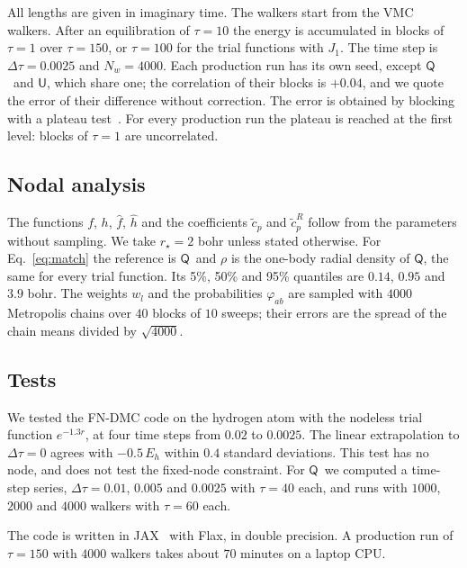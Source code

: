 \documentclass[aps,prb,reprint,amsmath,amssymb,superscriptaddress,nofootinbib]{revtex4-2}
\newcommand{\mQ}{\ensuremath{\textsf{Q}}}
\newcommand{\mU}{\ensuremath{\textsf{U}}}
\newcommand{\Eh}{\,E_h}
\begin{document}
All lengths are given in imaginary time. The walkers start from the VMC
walkers. After an equilibration of $\tau = 10$ the energy is accumulated in
blocks of $\tau = 1$ over $\tau = 150$, or $\tau = 100$ for the trial functions
with $J_1$. The time step is $\Delta\tau = 0.0025$ and $N_w = 4000$. Each
production run has its own seed, except \mQ\ and \mU, which share one; the
correlation of their blocks is $+0.04$, and we quote the error of their
difference without correction. The error is obtained by blocking with a
plateau test~\cite{flyvbjerg1989}. For every production run the plateau is
reached at the first level: blocks of $\tau = 1$ are uncorrelated.

\subsection{Nodal analysis}
\label{ssec:node_method}

The functions $f$, $h$, $\hat f$, $\hat h$ and the coefficients $\tilde c_p$
and $\tilde c_p^{R}$ follow from the parameters without sampling. We take
$r_\star = 2$ bohr unless stated otherwise. For Eq.~\eqref{eq:match} the
reference is \mQ\ and $\rho$ is the one-body radial density of \mQ, the same
for every trial function. Its 5\%, 50\% and 95\% quantiles are $0.14$, $0.95$
and $3.9$ bohr. The weights $w_l$ and the probabilities $\varphi_{ab}$ are
sampled with $4000$ Metropolis chains over $40$ blocks of $10$ sweeps; their
errors are the spread of the chain means divided by $\sqrt{4000}$.

\subsection{Tests}
\label{ssec:tests}

We tested the FN-DMC code on the hydrogen atom with the nodeless trial
function $e^{-1.3 r}$, at four time steps from $0.02$ to $0.0025$. The linear
extrapolation to $\Delta\tau = 0$ agrees with $-0.5\Eh$ within $0.4$ standard
deviations. This test has no node, and does not test the fixed-node
constraint. For \mQ\ we computed a time-step series, $\Delta\tau = 0.01$,
$0.005$ and $0.0025$ with $\tau = 40$ each, and runs with $1000$, $2000$ and
$4000$ walkers with $\tau = 60$ each.

The code is written in JAX~\cite{jax2018} with Flax, in double precision. A
production run of $\tau = 150$ with $4000$ walkers takes about $70$ minutes
on a laptop CPU.


\end{document}
